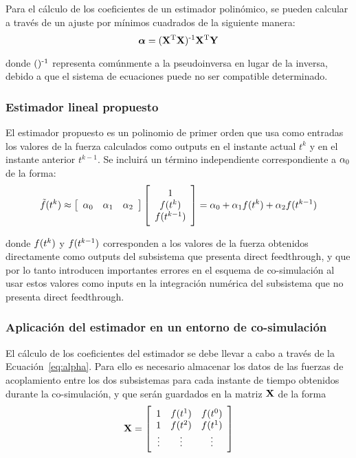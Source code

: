 Para el cálculo de los coeficientes de un estimador polinómico, se pueden calcular a través de un ajuste por mínimos cuadrados de la siguiente manera:
%
\begin{equation}
    \coefficients = (\estimation\trans \estimation)\inv \estimation\trans \estimated
    \label{eq:alpha}
\end{equation}

donde $()\inv$ representa comúnmente a la pseudoinversa en lugar de la inversa, debido a que el sistema de ecuaciones puede no ser compatible determinado.

\subsubsection{Estimador lineal propuesto}

El estimador propuesto es un polinomio de primer orden que usa como entradas los valores de la fuerza calculados como outputs en el instante actual $t^k$ y en el instante anterior $t^{k-1}$. Se incluirá un término independiente correspondiente a $\coefficient_0$ de la forma:
%
\begin{equation}
    \forceCorr (t^k) \approx \sqbr{\hvect{ccc}{\coefficient_0 & \coefficient_1 & \coefficient_2}} \sqbr{\cvvect{1 \\ \forceMod (t^k) \\ \forceMod (t^{k-1})}} = \coefficient_0 + \coefficient_1 \forceMod (t^k) + \coefficient_2 \forceMod (t^{k-1})
\end{equation}

donde $\forceMod (t^k)$ y $\forceMod (t^{k-1})$ corresponden a los valores de la fuerza obtenidos directamente como outputs del subsistema que presenta direct feedthrough, y que por lo tanto introducen importantes errores en el esquema de co-simulación al usar estos valores como inputs en la integración numérica del subsistema que no presenta direct feedthrough.


\subsubsection{Aplicación del estimador en un entorno de co-simulación}

El cálculo de los coeficientes del estimador se debe llevar a cabo a través de la Ecuación~\eqref{eq:alpha}. Para ello es necesario almacenar los datos de las fuerzas de acoplamiento entre los dos subsistemas para cada instante de tiempo obtenidos durante la co-simulación, y que serán guardados en la matriz $\estimation$ de la forma
%
\begin{equation}
    \estimation = \sqbr{\matr{ccc}
    {1 & \forceMod (t^1) &\forceMod (t^0) \\
    1 & \forceMod (t^2) & \forceMod (t^1) \\
    \vdots & \vdots &\vdots}} 
\end{equation}

